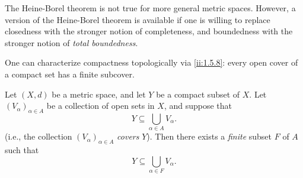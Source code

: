 \begin{note}
  The Heine-Borel theorem is not true for more general metric spaces.
  However, a version of the Heine-Borel theorem is available if one is willing to replace closedness with the stronger notion of completeness, and boundedness with the stronger notion of \emph{total boundedness}.
\end{note}

\begin{note}
  One can characterize compactness topologically via \cref{ii:1.5.8}:
  every open cover of a compact set has a finite subcover.
\end{note}

\begin{thm}\label{ii:1.5.8}
  Let \((X, d)\) be a metric space, and let \(Y\) be a compact subset of \(X\).
  Let \((V_{\alpha})_{\alpha \in A}\) be a collection of open sets in \(X\), and suppose that
  \[
    Y \subseteq \bigcup_{\alpha \in A} V_{\alpha}.
  \]
  (i.e., the collection \((V_{\alpha})_{\alpha \in A}\) \emph{covers} \(Y\)).
  Then there exists a \emph{finite} subset \(F\) of \(A\) such that
  \[
    Y \subseteq \bigcup_{\alpha \in F} V_{\alpha}.
  \]
\end{thm}

